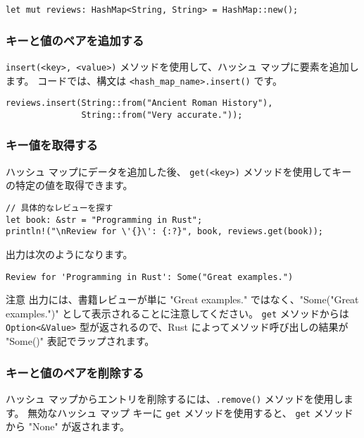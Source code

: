 \begin{lstlisting}[numbers=none]
let mut reviews: HashMap<String, String> = HashMap::new();
\end{lstlisting}

\subsubsection{キーと値のペアを追加する}

\texttt{insert(<key>, <value>)} メソッドを使用して、ハッシュ マップに要素を追加します。 コードでは、構文は \texttt{<hash\_map\_name>.insert()} です。

\begin{lstlisting}[numbers=none]
reviews.insert(String::from("Ancient Roman History"),
               String::from("Very accurate."));
\end{lstlisting}

\subsubsection{キー値を取得する}

ハッシュ マップにデータを追加した後、 \texttt{get(<key>)} メソッドを使用してキーの特定の値を取得できます。


\begin{lstlisting}[numbers=none]
// 具体的なレビューを探す
let book: &str = "Programming in Rust";
println!("\nReview for \'{}\': {:?}", book, reviews.get(book));
\end{lstlisting}

出力は次のようになります。

\begin{lstlisting}[numbers=none]
Review for 'Programming in Rust': Some("Great examples.")
\end{lstlisting}

\begin{itembox}[l]{注意}
出力には、書籍レビューが単に "Great examples." ではなく、"Some("Great examples.")" として表示されることに注意してください。 \texttt{get} メソッドからは \texttt{Option<\&Value>} 型が返されるので、Rust によってメソッド呼び出しの結果が "Some()" 表記でラップされます。
\end{itembox}

\subsubsection{キーと値のペアを削除する}

ハッシュ マップからエントリを削除するには、\texttt{.remove()} メソッドを使用します。 無効なハッシュ マップ キーに \texttt{get} メソッドを使用すると、 \texttt{get} メソッドから "None" が返されます。


